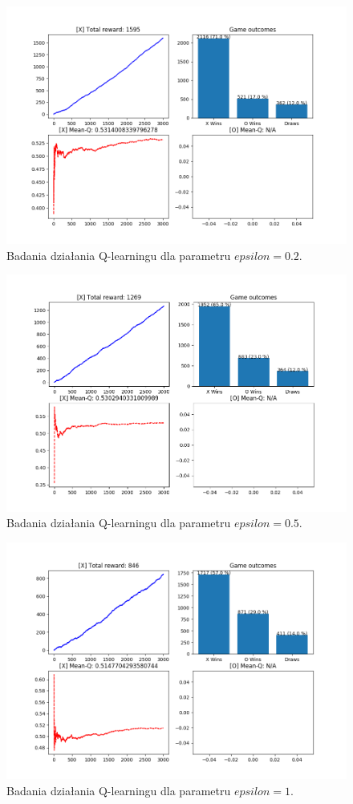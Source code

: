 \begin{figure}[H]
	\centering
	\includegraphics[width=0.7\linewidth]{imgs/q_learning/analysis/batch/eps/eps_02}
	\caption{Badania działania Q-learningu dla parametru $epsilon = 0.2$.}
\end{figure}

\begin{figure}[H]
	\centering
	\includegraphics[width=0.7\linewidth]{imgs/q_learning/analysis/batch/eps/eps_05}
	\caption{Badania działania Q-learningu dla parametru $epsilon = 0.5$.}
\end{figure}

\begin{figure}[H]
	\centering
	\includegraphics[width=0.7\linewidth]{imgs/q_learning/analysis/batch/eps/eps_1}
	\caption{Badania działania Q-learningu dla parametru $epsilon = 1$.}
\end{figure}

